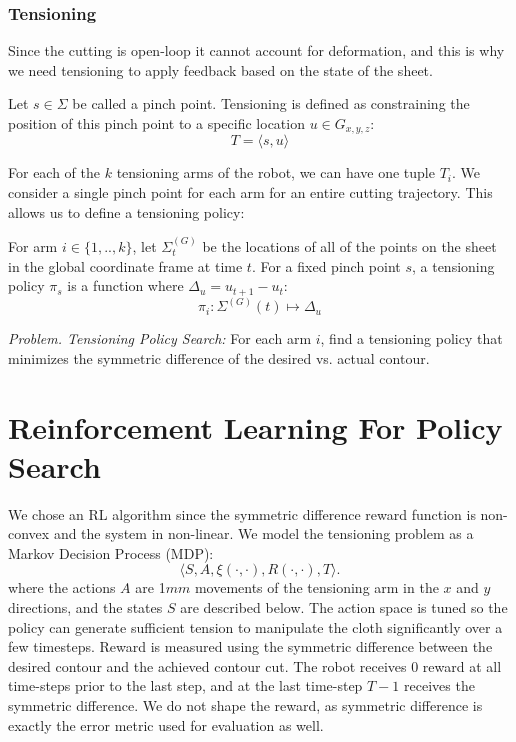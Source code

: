 \subsubsection{Tensioning}
Since the cutting is open-loop it cannot account for deformation, and this is why we need tensioning to apply feedback based on the state of the sheet.

\begin{definition}[Tensioning]
Let $s \in \Sigma$ be called a pinch point. 
Tensioning is defined as constraining the position of this pinch point to a specific location $u \in G_{x,y,z}$:
\[
T = \langle s, u \rangle
\]
\end{definition}

For each of the $k$ tensioning arms of the robot, we can have one tuple $T_i$. We consider a single pinch point for each arm for an entire cutting trajectory. This allows us to define a tensioning policy:

\begin{definition}
For arm $i\in \{1,..,k\}$, let $\Sigma^{(G)}_t$ be the locations of all of the points on the sheet in the global coordinate frame at time $t$. For a fixed pinch point $s$, a tensioning policy $\pi_s$ is a function where $\Delta_u = u_{t+1} - u_{t}$:
\[
\pi_i: \Sigma^{(G)}(t) \mapsto \Delta_u
\]

\end{definition}

\vspace{0.5em} \noindent\emph{Problem. Tensioning Policy Search: } For each arm $i$, find a tensioning policy that minimizes the symmetric difference of the desired vs. actual contour. 

\section{Reinforcement Learning For Policy Search}
We chose an RL algorithm since the symmetric difference reward function is non-convex and the system in non-linear.
We model the tensioning problem as a Markov Decision Process (MDP):
\[
\langle S,A,\xi(\cdot,\cdot), R(\cdot,\cdot),T \rangle.
\]
where the actions $A$ are 1$mm$ movements of the tensioning arm in the $x$ and $y$ directions, and the states $S$ are described below. The action space is tuned so the policy can generate sufficient tension to manipulate the cloth significantly over a few timesteps.  
Reward is measured using the symmetric difference between the desired contour and the achieved contour cut.
The robot receives 0 reward at all time-steps prior to the last step, and at the last time-step $T-1$ receives the symmetric difference. We do not shape the reward, as symmetric difference is exactly the error metric used for evaluation as well.

